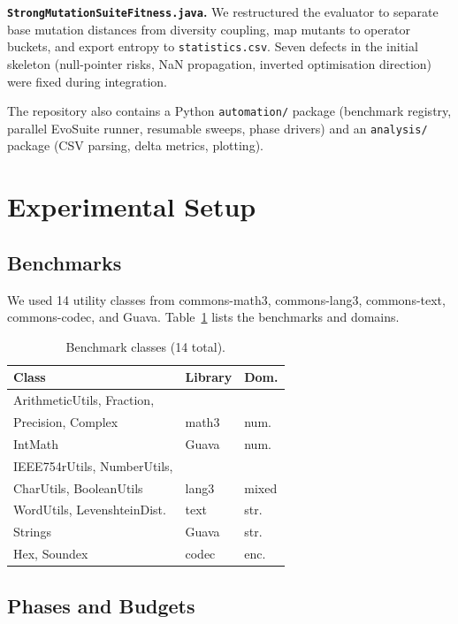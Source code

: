 \documentclass{IEEEtran}
\begin{document}
\textbf{\texttt{StrongMutationSuiteFitness.java}.}
We restructured the evaluator to separate base mutation distances from diversity coupling, map mutants to operator buckets, and export entropy to \texttt{statistics.csv}.
Seven defects in the initial skeleton (null-pointer risks, NaN propagation, inverted optimisation direction) were fixed during integration.

The repository also contains a Python \texttt{automation/} package (benchmark registry, parallel EvoSuite runner, resumable sweeps, phase drivers) and an \texttt{analysis/} package (CSV parsing, delta metrics, plotting).

\section{Experimental Setup}

\subsection{Benchmarks}

We used 14 utility classes from commons-math3, commons-lang3, commons-text, commons-codec, and Guava.
Table~\ref{tab:benchmarks} lists the benchmarks and domains.

\begin{table}[htbp]
\caption{Benchmark classes (14 total).}
\label{tab:benchmarks}
\centering
\footnotesize
\setlength{\tabcolsep}{3pt}
\begin{tabular}{@{}lll@{}}
\toprule
Class & Library & Dom. \\
\midrule
ArithmeticUtils, Fraction, & & \\
Precision, Complex & math3 & num. \\
IntMath & Guava & num. \\
IEEE754rUtils, NumberUtils, & & \\
CharUtils, BooleanUtils & lang3 & mixed \\
WordUtils, LevenshteinDist. & text & str. \\
Strings & Guava & str. \\
Hex, Soundex & codec & enc. \\
\bottomrule
\end{tabular}
\end{table}

\subsection{Phases and Budgets}
\end{document}
